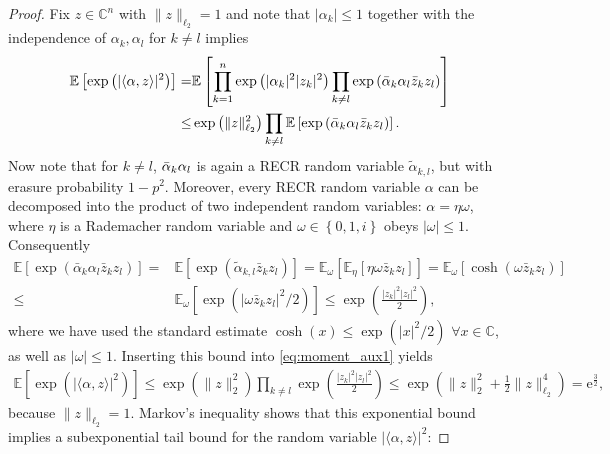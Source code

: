 \begin{proof}
Fix $ z \in \mathbb{C}^n$ with $\|  z \|_{\ell_2}=1$ and note that $|\alpha_k| \leq 1$ together with the independence of $\alpha_k,\alpha_l$ for $k \neq l$ implies
\begin{align}
  \mathbb{E} \left[ \exp \left( | \langle \alpha,  z \rangle|^2 \right) \right]
  =& \mathbb{E} \left[ \prod_{k=1}^n \exp \left( | \alpha_k|^2 |z_k|^2 \right) \prod_{k \neq l} \exp \left( \bar{\alpha}_k \alpha_l \bar{z}_k z_l \right) \right] \nonumber \\
  \leq& \exp \left( \|  z \|_{\ell_2}^2 \right) \prod_{k \neq l} \mathbb{E} \left[  \exp \left( \bar{\alpha}_k \alpha_l \bar{z}_k z_l \right)  \right]. \label{eq:moment_aux1}
\end{align}
Now note that for $k \neq l$, $\bar{\alpha}_k \alpha_l$ is again a RECR random variable $\tilde{\alpha}_{k,l}$, but with erasure probability $1-p^2$.
Moreover, every RECR random variable $\alpha$ can be decomposed into the product of two independent random variables: $ \alpha= \eta \omega$, where $\eta$ is a Rademacher random variable and $\omega \in \left\{0, 1,i \right\}$ obeys $| \omega | \leq 1$.
Consequently
\begin{align*}
  \mathbb{E} \left[ \exp \left( \bar{\alpha}_k \alpha_l \bar{z}_k z_l \right) \right]
  =& \mathbb{E} \left[ \exp \left( \tilde{\alpha}_{k,l} \bar{z}_k z_l \right) \right]
  = \mathbb{E}_{\omega} \left[ \mathbb{E}_\eta \left[ \eta \omega \bar{z}_k  z_l \right] \right]
  = \mathbb{E}_{\omega} \left[ \cosh \left( \omega \bar{z}_k z_l \right) \right] \\
  \leq & \mathbb{E}_\omega \left[ \exp \left( |\omega \bar{z}_k z_l|^2/2 \right) \right]
  \leq  \exp \left( \frac{|z_k|^2 |z_l|^2}{2} \right),
\end{align*}
where we have used the standard estimate $\cosh (x) \leq \exp \left( |x|^2/2 \right)$ $\forall x \in \mathbb{C}$, as well as $| \omega| \leq 1$. Inserting this bound into \eqref{eq:moment_aux1} yields
\begin{align*}
  \mathbb{E} \left[ \exp \left( | \langle  \alpha,  z \rangle|^2 \right) \right]
  \leq \exp \left( \|  z \|_2^2 \right) \prod_{k \neq l} \exp \left( \frac{|z_k|^2 |z_l|^2}{2} \right)
  \leq \exp \left( \|  z \|_2^2 + \frac{1}{2}\|  z \|_{\ell_2}^4 \right) = \mathrm{e}^{\frac{3}{2}},
\end{align*}
because $\|  z \|_{\ell_2}=1$.
Markov's inequality shows that this exponential bound implies a subexponential tail bound for the random variable $| \langle  \alpha, z \rangle|^2$:

\end{proof}
